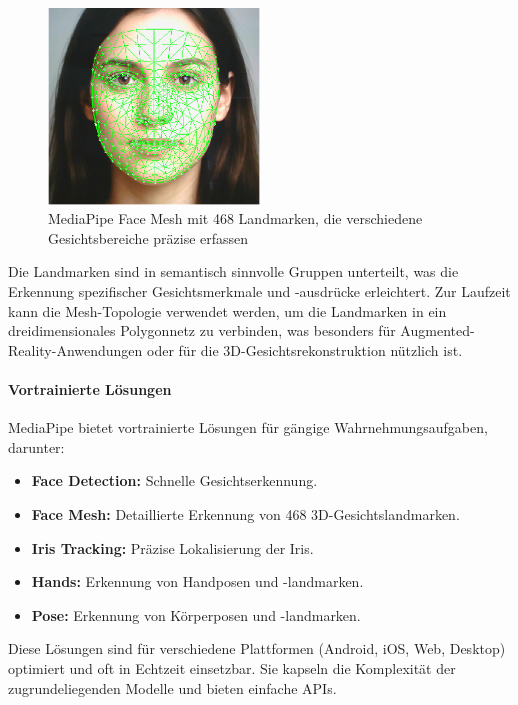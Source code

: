 \begin{figure}[htbp]
    \centering
    \includegraphics[width=0.5\textwidth]{data/FaceMesh_Mediapipe.png}
    \caption{MediaPipe Face Mesh mit 468 Landmarken, die verschiedene Gesichtsbereiche präzise erfassen}
    \label{fig:mediapipe_face_mesh}
\end{figure}

Die Landmarken sind in semantisch sinnvolle Gruppen unterteilt, was die Erkennung spezifischer Gesichtsmerkmale und -ausdrücke erleichtert. Zur Laufzeit kann die Mesh-Topologie verwendet werden, um die Landmarken in ein dreidimensionales Polygonnetz zu verbinden, was besonders für Augmented-Reality-Anwendungen oder für die 3D-Gesichtsrekonstruktion nützlich ist.

\paragraph{Vortrainierte Lösungen}
MediaPipe bietet vortrainierte Lösungen für gängige Wahrnehmungsaufgaben, darunter:

\begin{itemize}
    \item \textbf{Face Detection:} Schnelle Gesichtserkennung.
    \item \textbf{Face Mesh:} Detaillierte Erkennung von 468 3D-Gesichtslandmarken.
    \item \textbf{Iris Tracking:} Präzise Lokalisierung der Iris.
    \item \textbf{Hands:} Erkennung von Handposen und -landmarken.
    \item \textbf{Pose:} Erkennung von Körperposen und -landmarken.
\end{itemize}

Diese Lösungen sind für verschiedene Plattformen (Android, iOS, Web, Desktop) optimiert und oft in Echtzeit einsetzbar. Sie kapseln die Komplexität der zugrundeliegenden Modelle und bieten einfache APIs.

